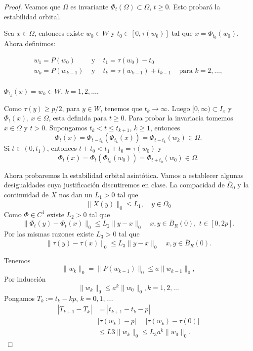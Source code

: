 \begin{proof}
Veamos que $\Omega$ es invariante $\Phi_t(\Omega)\subset\Omega$, $t\geq 0$. Esto probará la estabilidad orbital. 

Sea $x\in\Omega$, entonces existe $w_0\in W$ y $t_0\in[0,\tau(w_0)]$ tal que $x=\Phi_{t_0}(w_0)$. Ahora definimos:

\[
 \begin{array}{cccc}
 w_{1}=P(w_{0})  &  \text{ y }  &    t_1=\tau(w_{0})-t_{0}     &  \\
    w_{k}=P(w_{k-1})  &  \text{ y }  &    t_k=\tau(w_{k-1})+t_{k-1}     &      \text{ para } k=2,\ldots,\\
 \end{array}
\]




\begin{ejercicio}{} $\Phi_{t_k}(x)=w_k\in W$, $k=1,2,\ldots$.
 \end{ejercicio}


Como $\tau(y)\geq p/2$, para $y\in W$, tenemos que $t_k\to\infty$. Luego $[0,\infty)\subset I_x$ y $\Phi_t(x)$, $x\in\Omega$, esta definida para $t\geq 0$. Para probar la 
invariacia tomemos $x\in\Omega$ y $t>0$. Supongamos $t_k<t\leq t_{k+1}$, $k\geq 1$, entonces
\[
 \Phi_t(x)=\Phi_{t-t_k}\left(\Phi_{t_k}(x)\right)=\Phi_{t-t_k}(w_k)\in\Omega.
\]
Si $t\in (0,t_1)$, entonces $t+t_0<t_1+t_0=\tau(w_0)$ y 
\[
 \Phi_t(x)=\Phi_{t}\left(\Phi_{t_0}(w_0)\right)=\Phi_{t+t_0}(w_0)\in\Omega.
\]

Ahora probaremos la estabilidad orbital asintótica.  Vamos a establecer algunas desigualdades cuya justificación discutiremos en clase. La compacidad de
$\overline{\Omega}_0$ y la continuidad de $X$ nos dan un $L_1>0$ tal que
\[\|X(y)\|_0\leq L_1, \quad y\in\overline{\Omega}_0\]
Como $\Phi\in C^1$ existe $L_2>0$ tal  que 
\[\|\Phi_t(y)-\Phi_t(x)\|_0\leq L_2\|y-x\|_0\quad x,y\in \overline{B}_R(0),\,\, t\in[0,2p].\]
Por las mismas razones existe $L_3>0$ tal  que 
\[\|\tau(y)-\tau(x)\|_0\leq L_3\|y-x\|_0\quad x,y\in \overline{B}_R(0).\] 


Tenemos
\[\|w_k\|_0=\|P(w_{k-1})\|_0\leq a\|w_{k-1}\|_0,\]
Por inducción
\[\|w_k\|_0 \leq a^k\|w_{0}\|_0, k=1,2,\ldots\]
Pongamos $T_k:=t_k-kp$, $k=0,1,\ldots$.
\[\begin{split}
   |T_{k+1}-T_k|&=|t_{k+1}-t_k-p|\\
   &|\tau(w_k)-p|=|\tau(w_k)-\tau(0)|\\
   &\leq L3\|w_k\|_0\leq L_3a^k\|w_0\|_0.
  \end{split}
\]




\end{proof}

